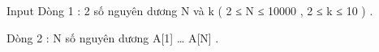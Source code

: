 Input
Dòng 1 : 2 số nguyên dương N và k ( 2 ≤ N ≤ 10000 , 2 ≤ k ≤ 10 ) .   


   Dòng 2 : N số nguyên dương A[1] … A[N] .